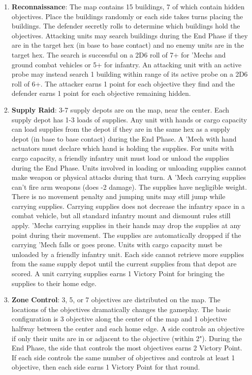 \begin{enumerate}

\item {\bfseries Reconnaissance}: The map contains 15 buildings, 7 of which contain hidden objectives.
Place the buildings randomly or each side takes turns placing the buildings.
The defender secretly rolls to determine which buildings hold the objectives.
Attacking units may search buildings during the End Phase if they are in the target hex (in base to base contact) and no enemy units are in the target hex.
The search is successful on a 2D6 roll of 7+ for 'Mechs and ground combat vehicles or 5+ for infantry.
An attacking unit with an active probe may instead search 1 building within range of its active probe on a 2D6 roll of 6+.
The attacker earns 1 point for each objective they find and the defender earns 1 point for each objective remaining hidden.

\item {\bfseries Supply Raid}: 3-7 supply depots are on the map, near the center.
Each supply depot has 1-3 loads of supplies.
Any unit with hands or cargo capacity can load supplies from the depot if they are in the same hex as a supply depot (in base to base contact) during the End Phase.
A 'Mech with hand actuators must declare which hand is holding the supplies.
For units with cargo capacity, a friendly infantry unit must load or unload the supplies during the End Phase.
Units involved in loading or unloading supplies cannot make weapon or physical attacks during that turn.
A 'Mech carrying supplies can't fire arm weapons (does -2 damage).
The supplies have negligible weight.
There is no movement penalty and jumping units may still jump while carrying supplies.
Carrying supplies does not decrease the infantry space in a combat vehicle, but all standard infantry mount and dismount rules still apply.
'Mechs carrying supplies in their hands may drop the supplies at any point during their movement.
The supplies are automatically dropped if the carrying 'Mech falls or goes prone.
Units with cargo capacity must be unloaded by a friendly infantry unit.
Each side cannot retrieve more supplies from the same supply depot until the current supplies from that depot are scored.
A unit carrying supplies earns 1 Victory Point for bringing the supplies to their home edge.

\item {\bfseries Zone Control}: 3, 5, or 7 objectives are distributed on the map.
The locations of the objectives dramatically changes the gameplay.
The basic configuration is 3 objective along the center of the map and 1 objective halfway between the center and each home edge.
A side controls an objective if only their units are in or adjacent to the objective (within 2").
During the End Phase, the side that controls the most objectives earns 2 Victory Point.
If each side controls the same number of objectives and controls at least 1 objective, then each side earns 1 Victory Point for that round.


\end{enumerate}
